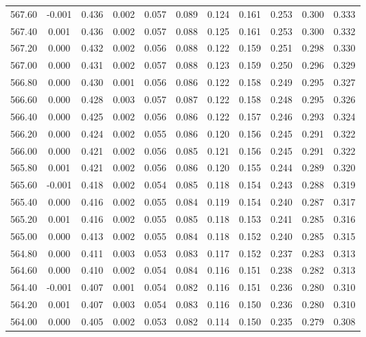 \begin{longtable}{cccccccccc}
    567.60 & -0.001 &  0.436 &  0.002 &  0.057 &  0.089 &  0.124 &  0.161 &  0.253 &  0.300 &  0.333 \\
    567.40 &  0.001 &  0.436 &  0.002 &  0.057 &  0.088 &  0.125 &  0.161 &  0.253 &  0.300 &  0.332 \\
    567.20 &  0.000 &  0.432 &  0.002 &  0.056 &  0.088 &  0.122 &  0.159 &  0.251 &  0.298 &  0.330 \\
    567.00 &  0.000 &  0.431 &  0.002 &  0.057 &  0.088 &  0.123 &  0.159 &  0.250 &  0.296 &  0.329 \\
    566.80 &  0.000 &  0.430 &  0.001 &  0.056 &  0.086 &  0.122 &  0.158 &  0.249 &  0.295 &  0.327 \\
    566.60 &  0.000 &  0.428 &  0.003 &  0.057 &  0.087 &  0.122 &  0.158 &  0.248 &  0.295 &  0.326 \\
    566.40 &  0.000 &  0.425 &  0.002 &  0.056 &  0.086 &  0.122 &  0.157 &  0.246 &  0.293 &  0.324 \\
    566.20 &  0.000 &  0.424 &  0.002 &  0.055 &  0.086 &  0.120 &  0.156 &  0.245 &  0.291 &  0.322 \\
    566.00 &  0.000 &  0.421 &  0.002 &  0.056 &  0.085 &  0.121 &  0.156 &  0.245 &  0.291 &  0.322 \\
    565.80 &  0.001 &  0.421 &  0.002 &  0.056 &  0.086 &  0.120 &  0.155 &  0.244 &  0.289 &  0.320 \\
    565.60 & -0.001 &  0.418 &  0.002 &  0.054 &  0.085 &  0.118 &  0.154 &  0.243 &  0.288 &  0.319 \\
    565.40 &  0.000 &  0.416 &  0.002 &  0.055 &  0.084 &  0.119 &  0.154 &  0.240 &  0.287 &  0.317 \\
    565.20 &  0.001 &  0.416 &  0.002 &  0.055 &  0.085 &  0.118 &  0.153 &  0.241 &  0.285 &  0.316 \\
    565.00 &  0.000 &  0.413 &  0.002 &  0.055 &  0.084 &  0.118 &  0.152 &  0.240 &  0.285 &  0.315 \\
    564.80 &  0.000 &  0.411 &  0.003 &  0.053 &  0.083 &  0.117 &  0.152 &  0.237 &  0.283 &  0.313 \\
    564.60 &  0.000 &  0.410 &  0.002 &  0.054 &  0.084 &  0.116 &  0.151 &  0.238 &  0.282 &  0.313 \\
    564.40 & -0.001 &  0.407 &  0.001 &  0.054 &  0.082 &  0.116 &  0.151 &  0.236 &  0.280 &  0.310 \\
    564.20 &  0.001 &  0.407 &  0.003 &  0.054 &  0.083 &  0.116 &  0.150 &  0.236 &  0.280 &  0.310 \\
    564.00 &  0.000 &  0.405 &  0.002 &  0.053 &  0.082 &  0.114 &  0.150 &  0.235 &  0.279 &  0.308 \\

\end{longtable}
